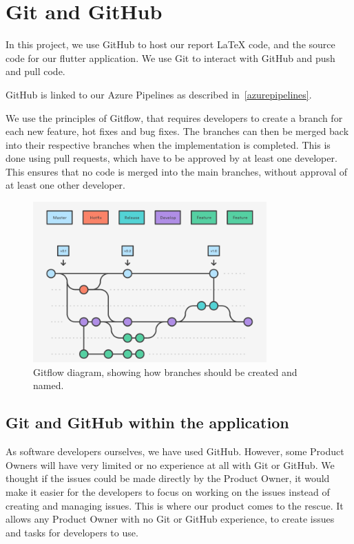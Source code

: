 \section{Git and GitHub}
In this project, we use GitHub to host our report LaTeX code, and the source code for our flutter application.
We use Git to interact with GitHub and push and pull code. 

GitHub is linked to our Azure Pipelines as described in~\autoref{azurepipelines}.

We use the principles of Gitflow, that requires developers to create a branch for each new feature, hot fixes and bug fixes. 
The branches can then be merged back into their respective branches when the implementation is completed.
This is done using pull requests, which have to be approved by at least one developer.
This ensures that no code is merged into the main branches, without approval of at least one other developer.

\begin{figure}[H]
    \centering
    \includegraphics[width=0.8\textwidth]{images/GitFlow.png}
    \caption{Gitflow diagram, showing how branches should be created and named.}
    \label{Gitflow}
\end{figure}

\subsection{Git and GitHub within the application}
As software developers ourselves, we have used GitHub.
However, some Product Owners will have very limited or no experience at all with Git or GitHub.
We thought if the issues could be made directly by the Product Owner, it would make it easier for the developers to focus on working on the issues instead of creating and managing issues. 
This is where our product comes to the rescue.
It allows any Product Owner with no Git or GitHub experience, to create issues and tasks for developers to use.


